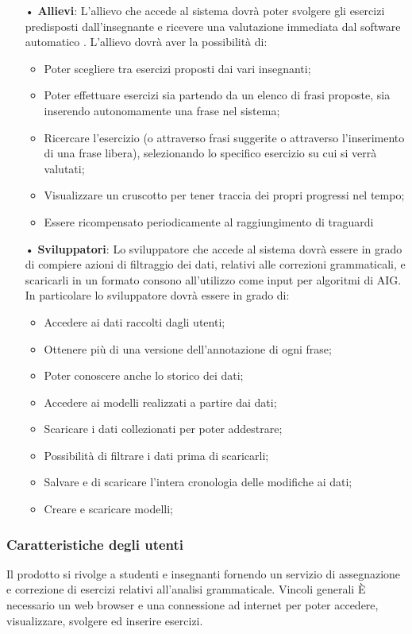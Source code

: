 \begin{itemize}
\item[•]\textbf{Allievi}:
L'allievo che accede al sistema dovrà poter svolgere gli esercizi predisposti dall'insegnante e ricevere una valutazione immediata dal software automatico .
L'allievo dovrà aver la possibilità di:
\begin{itemize}
\item Poter scegliere tra esercizi proposti dai vari insegnanti;
\item Poter effettuare esercizi sia partendo da un elenco di frasi proposte, sia inserendo autonomamente una frase nel sistema;
\item Ricercare l'esercizio (o attraverso frasi suggerite o attraverso l'inserimento di una frase libera), selezionando lo specifico esercizio su cui si verrà valutati; 
\item Visualizzare un cruscotto per tener traccia dei propri progressi nel tempo;
\item Essere ricompensato periodicamente al raggiungimento di traguardi
\end{itemize}
\item[•]\textbf{Sviluppatori}:
Lo sviluppatore che accede al sistema dovrà essere in grado di compiere azioni di filtraggio dei dati, relativi alle correzioni grammaticali, e scaricarli in un formato consono all'utilizzo come input per algoritmi di {AIG}. 
In particolare lo sviluppatore dovrà essere in grado di:
\begin{itemize}
\item Accedere ai dati raccolti dagli utenti;
\item Ottenere più di una versione dell'annotazione di ogni frase;
\item Poter conoscere anche lo storico dei dati;
\item Accedere ai modelli realizzati a partire dai dati;
\item Scaricare i dati collezionati per poter addestrare;
\item Possibilità di filtrare i dati prima di scaricarli;
\item Salvare e di scaricare l'intera cronologia delle modifiche ai dati;
\item Creare e scaricare modelli;
\end{itemize}
\end{itemize}
\subsubsection{Caratteristiche degli utenti}
Il prodotto si rivolge a studenti e insegnanti fornendo un servizio di assegnazione e correzione di esercizi relativi all'analisi grammaticale.  
Vincoli generali
\uppercase{è} necessario un web browser e una connessione ad internet per poter accedere, visualizzare, svolgere ed inserire esercizi.

